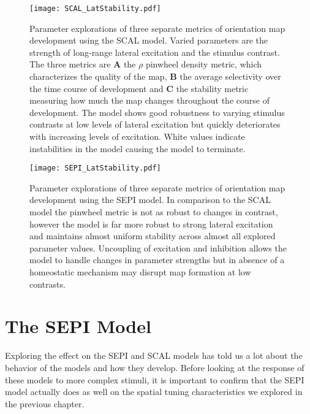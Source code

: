 \begin{figure}
	\centering
        \texttt{[image: SCAL\_LatStability.pdf]}
	\caption{Parameter explorations of three separate metrics of
          orientation map development using the SCAL model. Varied
          parameters are the strength of long-range lateral excitation
          and the stimulus contrast. The three metrics are \textbf{A}
          the $\rho$ pinwheel density metric, which characterizes the
          quality of the map, \textbf{B} the average selectivity over
          the time course of development and \textbf{C} the stability
          metric measuring how much the map changes throughout the
          course of development. The model shows good robustness to
          varying stimulus contrasts at low levels of lateral
          excitation but quickly deteriorates with increasing levels
          of excitation. White values indicate instabilities in the
          model causing the model to terminate.}
	\label{SCALStability}
\end{figure}


\begin{figure}
	\centering
        \texttt{[image: SEPI\_LatStability.pdf]}
	\caption{Parameter explorations of three separate metrics of
          orientation map development using the SEPI model. In
          comparison to the SCAL model the pinwheel metric is not as
          robust to changes in contrast, however the model is far more
          robust to strong lateral excitation and maintains almost
          uniform stability across almost all explored parameter
          values. Uncoupling of excitation and inhibition allows the
          model to handle changes in parameter strengths but in
          absence of a homeostatic mechanism may disrupt map formation
          at low contrasts.}
	\label{SEPIStability}
\end{figure}

\section{The SEPI Model}

Exploring the effect on the SEPI and SCAL models has told us a lot
about the behavior of the models and how they develop. Before looking
at the response of these models to more complex stimuli, it is
important to confirm that the SEPI model actually does as well on the
spatial tuning characteristics we explored in the previous chapter.

